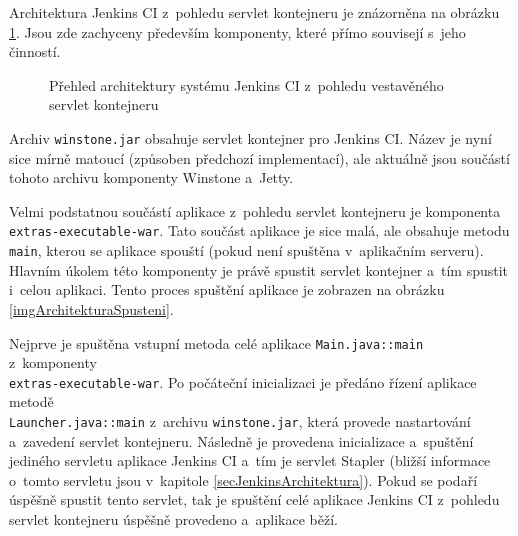             Architektura Jenkins CI z~pohledu servlet kontejneru je znázorněna na obrázku \ref{imgArchitekturaServlet}.
            Jsou zde zachyceny především komponenty, které přímo souvisejí s~jeho činností.

            \begin{figure}[h!t]
                \begin{center}
                    \caption{Přehled architektury systému Jenkins CI z~pohledu vestavěného servlet kontejneru}
                    \label{imgArchitekturaServlet}
                \end{center}
            \end{figure}

            
            Archiv \texttt{winstone.jar} obsahuje servlet kontejner pro Jenkins CI. Název je nyní sice mírně matoucí
            (způsoben předchozí implementací), ale aktuálně jsou součástí tohoto archivu komponenty Winstone a~Jetty.

            Velmi podstatnou součástí aplikace z~pohledu servlet kontejneru je komponenta\\\texttt{extras-executable-war}. 
            Tato součást aplikace je sice malá, ale obsahuje metodu \texttt{main}, kterou se aplikace spouští 
            (pokud není spuštěna v~aplikačním serveru). Hlavním úkolem této komponenty je právě spustit 
            servlet kontejner a~tím spustit i~celou aplikaci. Tento proces spuštění aplikace je zobrazen
            na obrázku \ref{imgArchitekturaSpusteni}.

            Nejprve je spuštěna vstupní metoda celé aplikace \texttt{Main.java::main} z~komponenty\\\texttt{extras-executable-war}.
            Po počáteční inicializaci je předáno řízení aplikace metodě \\\texttt{Launcher.java::main}
            z~archivu \texttt{winstone.jar}, která provede nastartování
            a~zavedení servlet kontejneru. Následně je provedena inicializace a~spuštění
            jediného servletu aplikace Jenkins CI a~tím je servlet Stapler (bližší informace o~tomto
            servletu jsou v~kapitole \ref{secJenkinsArchitektura}). 
            Pokud se podaří úspěšně spustit tento servlet, tak je spuštění celé aplikace Jenkins CI z~pohledu
            servlet kontejneru úspěšně provedeno a~aplikace běží.

